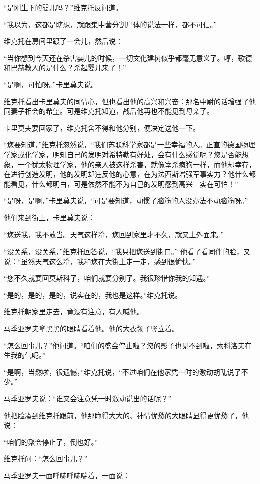 “是刚生下的婴儿吗？”维克托反问道。

“我以为，这都是瞎想，就跟集中营分割尸体的说法一样，都不可信。”

维克托在房间里踱了一会儿，然后说：

“当你想到今天还在杀害婴儿的时候，一切文化建树似乎都毫无意义了。哼，歌德和巴赫教人的是什么？杀起婴儿来了！”

“是啊，可怕呀。”卡里莫夫说。

维克托看出卡里莫夫的同情心，但也看出他的高兴和兴奋：那名中尉的话增强了他同妻子相会的希望。可是维克托知道，战后他再也不能见到母亲了。

卡里莫夫要回家了，维克托舍不得和他分别，便决定送他一下。

“您要知道，”维克托忽然说，“我们苏联科学家都是一些幸福的人。正直的德国物理学家或化学家，明知自己的发明对希特勒有好处，会有什么感觉呢？您是否能想象，一个犹太物理学家，他的亲人被这样杀害，就像宰杀疯狗一样，而他却幸存，在进行创造发明，他的发明却违反他的心意，在为法西斯增强军事实力？他什么都能看见，什么都明白，可是依然不能不为自己的发明感到高兴—实在可怕！”

“是呀，是啊，”卡里莫夫说，“可是要知道，动惯了脑筋的人没办法不动脑筋呀。”

他们来到街上，卡里莫夫说：

“您送我，我不敢当。天气这样冷，您回到家里才不久，就又上外面来。”

“没关系，没关系，”维克托回答说，“我只把您送到街口。” 他看了看同伴的脸，又说：“虽然天气这么冷，我和您在大街上走一走，感到很愉快。”

“您不久就要回莫斯科了，咱们就要分别了。我很珍惜你我的知遇。”

“是的，是的，是的，说实在的，我也是这样。”维克托说。

维克托朝家里走去，竟没有注意，有人喊他。

马季亚罗夫拿黑黑的眼睛看着他。他的大衣领子竖立着。

“怎么回事儿？”他问道。“咱们的盛会停止啦？您的影子也见不到啦，索科洛夫在生我的气呢。”

“是啊，当然啦，很遗憾，”维克托说，“不过咱们在他家凭一时的激动胡乱说了不少。”

马季亚罗夫说：“谁又会注意凭一时激动说出的话呢？”

他把脸凑到维克托跟前，他那睁得大大的、神情忧愁的大眼睛显得更忧愁了，他说：

“咱们的聚会停止了，倒也好。”

维克托问：“怎么回事儿？”

马季亚罗夫一面呼哧呼哧喘着，一面说：


